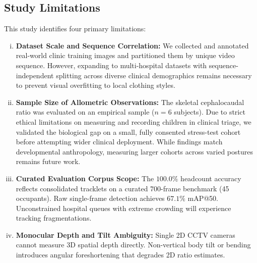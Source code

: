 \subsection{Study Limitations}
This study identifies four primary limitations:
\begin{enumerate}[(i)]
    \item \textbf{Dataset Scale and Sequence Correlation:} We collected and annotated real-world clinic training images and partitioned them by unique video sequence. However, expanding to multi-hospital datasets with sequence-independent splitting across diverse clinical demographics remains necessary to prevent visual overfitting to local clothing styles.
    \item \textbf{Sample Size of Allometric Observations:} The skeletal cephalocaudal ratio was evaluated on an empirical sample ($n=6$ subjects). Due to strict ethical limitations on measuring and recording children in clinical triage, we validated the biological gap on a small, fully consented stress-test cohort before attempting wider clinical deployment. While findings match developmental anthropology, measuring larger cohorts across varied postures remains future work.
    \item \textbf{Curated Evaluation Corpus Scope:} The $100.0\%$ headcount accuracy reflects consolidated tracklets on a curated 700-frame benchmark (45 occupants). Raw single-frame detection achieves $67.1\%$ mAP@50. Unconstrained hospital queues with extreme crowding will experience tracking fragmentations.
    \item \textbf{Monocular Depth and Tilt Ambiguity:} Single 2D CCTV cameras cannot measure 3D spatial depth directly. Non-vertical body tilt or bending introduces angular foreshortening that degrades 2D ratio estimates.
\end{enumerate}

